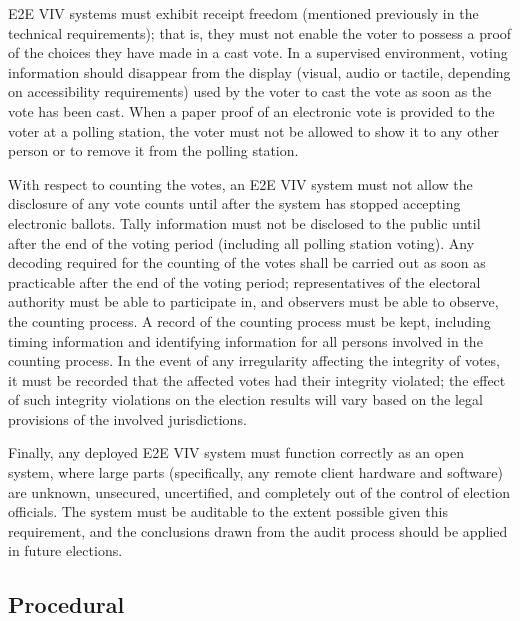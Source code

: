 E2E VIV systems must exhibit receipt freedom (mentioned previously in
the technical requirements); that is, they must not enable the voter
to possess a proof of the choices they have made in a cast vote. In a
supervised environment, voting information should disappear from the
display (visual, audio or tactile, depending on accessibility
requirements) used by the voter to cast the vote as soon as the vote
has been cast. When a paper proof of an electronic vote is provided to
the voter at a polling station, the voter must not be allowed to show
it to any other person or to remove it from the polling station.  

With respect to counting the votes, an E2E VIV system must not allow
the disclosure of any vote counts until after the system has stopped
accepting electronic ballots. Tally information must not be disclosed
to the public until after the end of the voting period (including all
polling station voting). Any decoding required for the counting of the
votes shall be carried out as soon as practicable after the end of the
voting period; representatives of the electoral authority must be able
to participate in, and observers must be able to observe, the counting
process. A record of the counting process must be kept, including
timing information and identifying information for all persons
involved in the counting process. In the event of any irregularity
affecting the integrity of votes, it must be recorded that the
affected votes had their integrity violated; the effect of such
integrity violations on the election results will vary based on the
legal provisions of the involved jurisdictions.

Finally, any deployed E2E VIV system must function correctly as an
open system, where large parts (specifically, any remote client
hardware and software) are unknown, unsecured, uncertified, and
completely out of the control of election officials. The system must
be auditable to the extent possible given this requirement, and the
conclusions drawn from the audit process should be applied in future
elections.

\subsection{Procedural}

